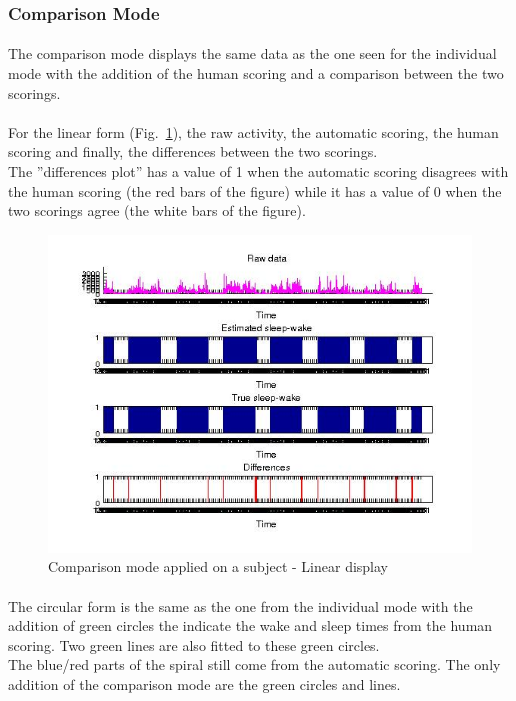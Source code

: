 \documentclass[a4paper,12pt]{article}
\begin{document}
\subsubsection{Comparison Mode}

\paragraph{}
The comparison mode displays the same data as the one seen for the individual mode with the addition of the human scoring and a comparison between the two scorings.

\paragraph{}
For the linear form (Fig.~\ref{comparisonLinear}), the raw activity, the automatic scoring, the human scoring and finally, the differences between the two scorings. \\
The ''differences plot'' has a value of 1 when the automatic scoring disagrees with the human scoring (the red bars of the figure) while it has a value of 0 when the two scorings agree (the white bars of the figure).

\begin{figure}[H]
\centering
\includegraphics[scale=0.75]{Images/comparisonResultsLinear.jpg}
\caption{Comparison mode applied on a subject - Linear display}
\label{comparisonLinear}
\end{figure}

\paragraph{}
The circular form is the same as the one from the individual mode with the addition of green circles the indicate the wake and sleep times from the human scoring. Two green lines are also fitted to these green circles. \\
The blue/red parts of the spiral still come from the automatic scoring. The only addition of the comparison mode are the green circles and lines.
\end{document}
